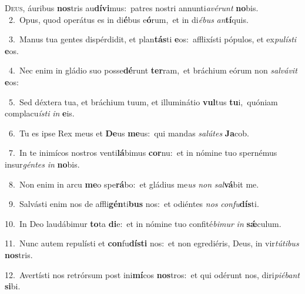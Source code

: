 \lettrine{\initial\textcolor{\initialcolor}{D}}{eus,} áuribus \textbf{nos}\-tris au\-\textbf{dí}\-\textbf{vi}mus:~\star patres nostri annunti\-\textit{a}\-\textit{vé}\textit{runt} \textbf{no}\-bis.\\
{\numbfont\textcolor{\numbcolor}{~2.}}~Opus, quod operátus es in di\-\textbf{é}\-bus e\-\textbf{ó}\-rum,~\star et in di\-\textit{é}\-\textit{bus} \textit{an}\-\textbf{tí}quis.\par
{\numbfont\textcolor{\numbcolor}{~3.}}~Manus tua gentes dispérdidit, et plan\-\textbf{tás}\-ti \textbf{e}\-os:~\star afflixísti pópulos, et ex\-\textit{pu}\-\textit{lís}\textit{ti} \textbf{e}\-os.\par
{\numbfont\textcolor{\numbcolor}{~4.}}~Nec enim in gládio suo posse\-\textbf{dé}\-runt \textbf{ter}\-ram,~\star et bráchium eórum non \textit{sal}\-\textit{vá}\textit{vit} \textbf{e}\-os:\par
{\numbfont\textcolor{\numbcolor}{~5.}}~Sed déxtera tua, et bráchium tuum, et illuminátio \textbf{vul}\-tus \textbf{tu}\-i,~\star quóniam complacu\-\textit{ís}\-\textit{ti} \textit{in} \textbf{e}\-is.\par
{\numbfont\textcolor{\numbcolor}{~6.}}~Tu es ipse Rex meus et \textbf{De}\-us \textbf{me}\-us:~\star qui mandas \textit{sa}\-\textit{lú}\textit{tes} \textbf{Ja}\-cob.\par
{\numbfont\textcolor{\numbcolor}{~7.}}~In te inimícos nostros venti\-\textbf{lá}\-bimus \textbf{cor}\-nu:~\star et in nómine tuo spernémus insur\-\textit{gén}\-\textit{tes} \textit{in} \textbf{no}\-bis.\par
{\numbfont\textcolor{\numbcolor}{~8.}}~Non enim in arcu \textbf{me}\-o spe\-\textbf{rá}\-bo:~\star et gládius me\textit{us} \textit{non} \textit{sal}\-\textbf{vá}bit me.\par
{\numbfont\textcolor{\numbcolor}{~9.}}~Salvásti enim nos de affli\-\textbf{gén}\-ti\textbf{bus} nos:~\star et odiéntes \textit{nos} \textit{con}\-\textit{fu}\textbf{dís}ti.\par
{\numbfont\textcolor{\numbcolor}{10.}}~In Deo laudábimur \textbf{to}\-ta \textbf{di}\-e:~\star et in nómine tuo confité\-\textit{bi}\-\textit{mur} \textit{in} \textbf{sǽ}\-culum.\par
{\numbfont\textcolor{\numbcolor}{11.}}~Nunc autem repulísti et \textbf{con}\-fu\-\textbf{dís}\-\textbf{ti} nos:~\star et non egrediéris, Deus, in vir\-\textit{tú}\-\textit{ti}\textit{bus} \textbf{nos}\-tris.\par
{\numbfont\textcolor{\numbcolor}{12.}}~Avertísti nos retrórsum post ini\-\textbf{mí}\-cos \textbf{nos}\-tros:~\star et qui odérunt nos, diri\-\textit{pi}\-\textit{é}\textit{bant} \textbf{si}\-bi.\par
